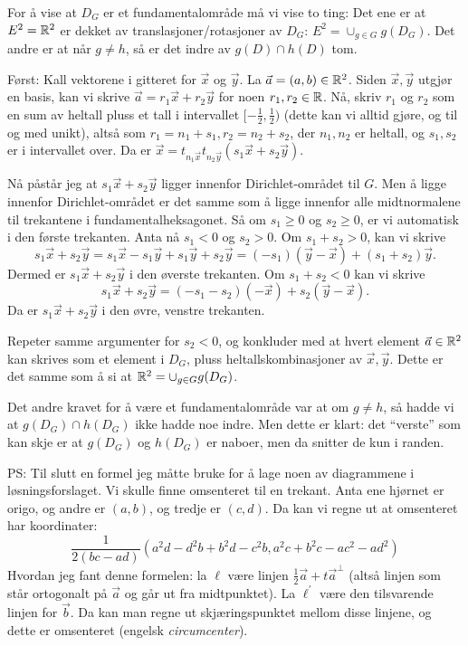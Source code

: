 \documentclass[11pt, norsk]{article}
\begin{document}
\begin{losn}
For å vise at $D_G$ er et fundamentalområde må vi vise to ting: Det ene er at $E^2=\mathbb{R}^2$ er dekket av translasjoner/rotasjoner av $D_G$: $E^2 = \cup_{g \in G} g(D_G)$. Det andre er at når $g \neq h$, så er det indre av $g(D) \cap h(D)$ tom.

Først: Kall vektorene i gitteret for $\vec x$ og $\vec y$. La $\vec a = (a,b) \in \mathbb{R}^2$. Siden $\vec x,\vec y$ utgjør en basis, kan vi skrive $\vec a = r_1 \vec x + r_2 \vec y$ for noen $r_1,r_2 \in \mathbb{R}$. Nå, skriv $r_1$ og $r_2$ som en sum av heltall pluss et tall i intervallet $[-\frac 12,\frac 12)$ (dette kan vi alltid gjøre, og til og med unikt), altså som $r_1=n_1 + s_1, r_2=n_2+s_2$, der $n_1,n_2$ er heltall, og $s_1,s_2$ er i intervallet over. Da er $\vec x = t_{n_1 \vec x}t_{n_2 \vec y}(s_1 \vec x + s_2 \vec y)$.

Nå påstår jeg at $s_1 \vec x + s_2 \vec y$ ligger innenfor Dirichlet-området til $G$. Men å ligge innenfor Dirichlet-området er det samme som å ligge innenfor alle midtnormalene til trekantene i fundamentalheksagonet. Så om $s_1 \geq 0$ og $s_2 \geq 0$, er vi automatisk i den første trekanten. Anta nå $s_1 < 0$ og $s_2 > 0$. Om $s_1+s_2 > 0$, kan vi skrive
\[
s_1 \vec x + s_2 \vec y = s_1 \vec x -s_1 \vec y +s_1 \vec y + s_2 \vec y = (-s_1)(\vec y - \vec x) + (s_1+s_2) \vec y.
\]
Dermed er $s_1 \vec x + s_2 \vec y$ i den øverste trekanten. Om $s_1 + s_2 < 0$ kan vi skrive
\[
s_1 \vec x + s_2 \vec y = (-s_1-s_2)(-\vec x) + s_2(\vec y- \vec x).
\]
Da er $s_1 \vec x + s_2 \vec y$ i den øvre, venstre trekanten.

Repeter samme argumenter for $s_2 < 0$, og konkluder med at hvert element $\vec a \in \mathbb{R}^2$ kan skrives som et element i $D_G$, pluss heltallskombinasjoner av $\vec x,\vec y$. Dette er det samme som å si at $\mathbb{R}^2 = \cup_{g \in G} g(D_G)$.

Det andre kravet for å være et fundamentalområde var at om $g \neq h$, så hadde vi at $g(D_G) \cap h(D_G)$ ikke hadde noe indre. Men dette er klart: det ``verste'' som kan skje er at $g(D_G)$ og $h(D_G)$ er naboer, men da snitter de kun i randen.
\end{losn}

PS: Til slutt en formel jeg måtte bruke for å lage noen av diagrammene i løsningsforslaget. Vi skulle finne omsenteret til en trekant. Anta ene hjørnet er origo, og andre er $(a,b)$, og tredje er $(c,d)$. Da kan vi regne ut at omsenteret har koordinater:
\[
\frac{1}{2(bc-ad)} \left( a^2d-d^2b+b^2d-c^2b, a^2c + b^2c - ac^2- ad^2 \right)
\]
Hvordan jeg fant denne formelen: la $\ell$ være linjen $\frac 12 \vec a + t \vec a^\perp$ (altså linjen som står ortogonalt på $\vec a$ og går ut fra midtpunktet). La $\ell^\prime$ være den tilsvarende linjen for $\vec b$. Da kan man regne ut skjæringspunktet mellom disse linjene, og dette er omsenteret (engelsk \emph{circumcenter}).
\end{document}
